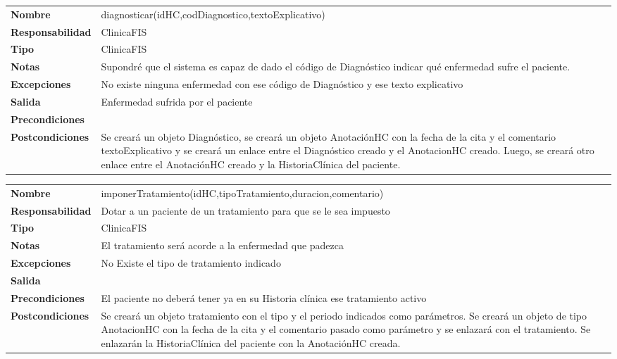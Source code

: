 \begin{table}[H]
\centering
	  \begin{tabularx}{\textwidth}{l|X}
    \textbf{Nombre}        & diagnosticar(idHC,codDiagnostico,textoExplicativo) \\ 
    \textbf{Responsabilidad}  & ClinicaFIS \\ 
    \textbf{Tipo}        &  ClinicaFIS\\ 
    \textbf{Notas}        &  Supondré que el sistema es capaz de dado el código de Diagnóstico indicar qué enfermedad sufre el paciente.\\ 
    \textbf{Excepciones}    & No existe ninguna enfermedad con ese código de Diagnóstico y ese texto explicativo \\ 
    \textbf{Salida}        & Enfermedad sufrida por el paciente  \\ 
    \textbf{Precondiciones}    &  \\ 
    \textbf{Postcondiciones}  & Se creará un objeto Diagnóstico, se creará un objeto AnotaciónHC con la fecha de la cita y el comentario textoExplicativo y se creará un enlace entre el Diagnóstico creado y el AnotacionHC creado. Luego, se creará otro enlace entre el AnotaciónHC creado y la HistoriaClínica del paciente. \\ 
  \end{tabularx}

\end{table}


\begin{table}[H]
\centering
	  \begin{tabularx}{\textwidth}{l|X}
    \textbf{Nombre}        & imponerTratamiento(idHC,tipoTratamiento,duracion,comentario) \\ 
    \textbf{Responsabilidad}  & Dotar a un paciente de un tratamiento para que se le sea impuesto  \\ 
    \textbf{Tipo}        & ClinicaFIS \\ 
    \textbf{Notas}        &  El tratamiento será acorde a la enfermedad que padezca\\ 
    \textbf{Excepciones}    & No Existe el tipo de tratamiento indicado \\ 
    \textbf{Salida}        &  \\ 
    \textbf{Precondiciones}    & El paciente no deberá tener ya en su Historia clínica ese tratamiento activo \\ 
    \textbf{Postcondiciones}  &  Se creará un objeto tratamiento con el tipo y el periodo indicados como parámetros. Se creará un objeto de tipo AnotacionHC con la fecha de la cita y el comentario pasado como parámetro y se enlazará con el tratamiento. Se enlazarán la HistoriaClínica del paciente con la AnotaciónHC creada.\\ 
  \end{tabularx}

\end{table}




